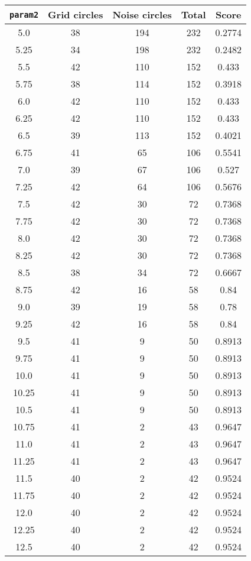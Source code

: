 \documentclass[letterpaper, 12pt]{article}
\begin{document}
\begin{longtable}{|c|c|c|c|c|}
\hline
\textbf{\texttt{param2}} & \textbf{Grid circles} & \textbf{Noise circles} & \textbf{Total} & \textbf{Score} \\
\hline
5.0 & 38 & 194 & 232 & 0.2774 \\
\hline
5.25 & 34 & 198 & 232 & 0.2482 \\
\hline
5.5 & 42 & 110 & 152 & 0.433 \\
\hline
5.75 & 38 & 114 & 152 & 0.3918 \\
\hline
6.0 & 42 & 110 & 152 & 0.433 \\
\hline
6.25 & 42 & 110 & 152 & 0.433 \\
\hline
6.5 & 39 & 113 & 152 & 0.4021 \\
\hline
6.75 & 41 & 65 & 106 & 0.5541 \\
\hline
7.0 & 39 & 67 & 106 & 0.527 \\
\hline
7.25 & 42 & 64 & 106 & 0.5676 \\
\hline
7.5 & 42 & 30 & 72 & 0.7368 \\
\hline
7.75 & 42 & 30 & 72 & 0.7368 \\
\hline
8.0 & 42 & 30 & 72 & 0.7368 \\
\hline
8.25 & 42 & 30 & 72 & 0.7368 \\
\hline
8.5 & 38 & 34 & 72 & 0.6667 \\
\hline
8.75 & 42 & 16 & 58 & 0.84 \\
\hline
9.0 & 39 & 19 & 58 & 0.78 \\
\hline
9.25 & 42 & 16 & 58 & 0.84 \\
\hline
9.5 & 41 & 9 & 50 & 0.8913 \\
\hline
9.75 & 41 & 9 & 50 & 0.8913 \\
\hline
10.0 & 41 & 9 & 50 & 0.8913 \\
\hline
10.25 & 41 & 9 & 50 & 0.8913 \\
\hline
10.5 & 41 & 9 & 50 & 0.8913 \\
\hline
10.75 & 41 & 2 & 43 & 0.9647 \\
\hline
11.0 & 41 & 2 & 43 & 0.9647 \\
\hline
11.25 & 41 & 2 & 43 & 0.9647 \\
\hline
11.5 & 40 & 2 & 42 & 0.9524 \\
\hline
11.75 & 40 & 2 & 42 & 0.9524 \\
\hline
12.0 & 40 & 2 & 42 & 0.9524 \\
\hline
12.25 & 40 & 2 & 42 & 0.9524 \\
\hline
12.5 & 40 & 2 & 42 & 0.9524 \\

\end{longtable}
\end{document}
